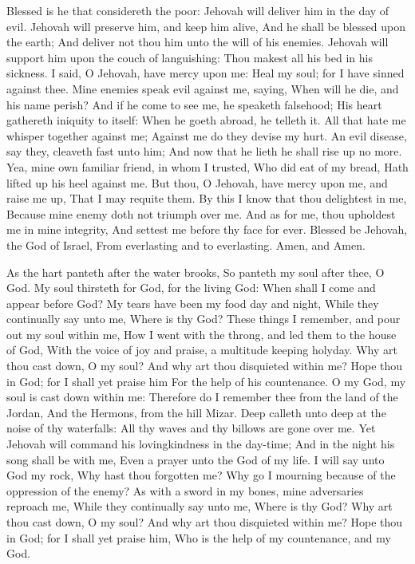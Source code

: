 Blessed is he that considereth the poor: Jehovah will deliver him in the day of evil.  Jehovah will preserve him, and keep him alive, And he shall be blessed upon the earth; And deliver not thou him unto the will of his enemies.  Jehovah will support him upon the couch of languishing: Thou makest all his bed in his sickness.  I said, O Jehovah, have mercy upon me: Heal my soul; for I have sinned against thee.  Mine enemies speak evil against me, saying, When will he die, and his name perish?  And if he come to see me, he speaketh falsehood; His heart gathereth iniquity to itself: When he goeth abroad, he telleth it.  All that hate me whisper together against me; Against me do they devise my hurt.  An evil disease, say they, cleaveth fast unto him; And now that he lieth he shall rise up no more.  Yea, mine own familiar friend, in whom I trusted, Who did eat of my bread, Hath lifted up his heel against me.  But thou, O Jehovah, have mercy upon me, and raise me up, That I may requite them.  By this I know that thou delightest in me, Because mine enemy doth not triumph over me.  And as for me, thou upholdest me in mine integrity, And settest me before thy face for ever.  Blessed be Jehovah, the God of Israel, From everlasting and to everlasting. Amen, and Amen. 

As the hart panteth after the water brooks, So panteth my soul after thee, O God.  My soul thirsteth for God, for the living God: When shall I come and appear before God?  My tears have been my food day and night, While they continually say unto me, Where is thy God?  These things I remember, and pour out my soul within me, How I went with the throng, and led them to the house of God, With the voice of joy and praise, a multitude keeping holyday.  Why art thou cast down, O my soul? And why art thou disquieted within me? Hope thou in God; for I shall yet praise him For the help of his countenance.  O my God, my soul is cast down within me: Therefore do I remember thee from the land of the Jordan, And the Hermons, from the hill Mizar.  Deep calleth unto deep at the noise of thy waterfalls: All thy waves and thy billows are gone over me.  Yet Jehovah will command his lovingkindness in the day-time; And in the night his song shall be with me, Even a prayer unto the God of my life.  I will say unto God my rock, Why hast thou forgotten me? Why go I mourning because of the oppression of the enemy?  As with a sword in my bones, mine adversaries reproach me, While they continually say unto me, Where is thy God?  Why art thou cast down, O my soul? And why art thou disquieted within me? Hope thou in God; for I shall yet praise him, Who is the help of my countenance, and my God. 


